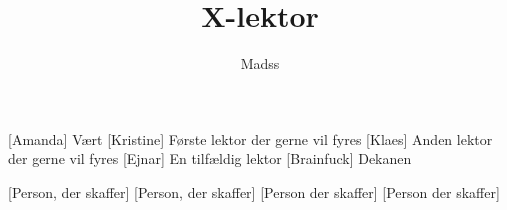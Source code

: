 \documentclass[a4paper,11pt]{article}
\title{X-lektor}
\author{Madss}
\begin{document}
\maketitle

\begin{roles}
[Amanda] Vært
[Kristine] Første lektor der gerne vil fyres
[Klaes] Anden lektor der gerne vil fyres
[Ejnar] En tilfældig lektor
[Brainfuck] Dekanen
\end{roles}

\begin{props}
[Person, der skaffer]
[Person, der skaffer]
[Person der skaffer]
[Person der skaffer]
\end{props}
  
\end{document}
